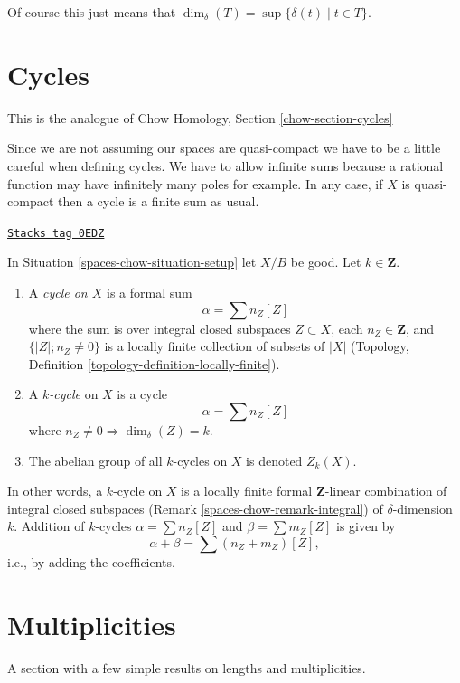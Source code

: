 Of course this just means that
$\dim_\delta(T) = \sup \{\delta(t) \mid t \in T\}$.

\section{Cycles}
\label{spaces-chow-section-cycles}
This is the analogue of Chow Homology, Section \ref{chow-section-cycles}

\medskip\noindent
Since we are not assuming our spaces are quasi-compact we have
to be a little careful when defining cycles. We have to allow
infinite sums because a rational function may have infinitely many
poles for example. In any case, if $X$ is quasi-compact then a
cycle is a finite sum as usual.

\begin{definition}[Cycles]
\label{spaces-chow-definition-cycles}
\href{https://stacks.math.columbia.edu/tag/0EDZ}{\texttt{Stacks tag 0EDZ}}

In Situation \ref{spaces-chow-situation-setup} let $X/B$ be good.
Let $k \in \mathbf{Z}$.
\begin{enumerate}
\item A {\it cycle on $X$} is a formal sum
$$
\alpha = \sum n_Z [Z]
$$
where the sum is over integral closed subspaces $Z \subset X$,
each $n_Z \in \mathbf{Z}$, and
$\{|Z|; n_Z \not = 0\}$ is a locally finite
collection of subsets of $|X|$
(Topology, Definition \ref{topology-definition-locally-finite}).
\item A {\it $k$-cycle} on $X$ is
a cycle
$$
\alpha = \sum n_Z [Z]
$$
where $n_Z \not = 0 \Rightarrow \dim_\delta(Z) = k$.
\item The abelian group of all $k$-cycles on $X$ is denoted $Z_k(X)$.
\end{enumerate}
\end{definition}

In other words, a $k$-cycle on $X$ is a locally finite formal
$\mathbf{Z}$-linear combination of integral closed subspaces
(Remark \ref{spaces-chow-remark-integral}) of $\delta$-dimension $k$.
Addition of $k$-cycles $\alpha = \sum n_Z[Z]$ and
$\beta = \sum m_Z[Z]$ is given by
$$
\alpha + \beta = \sum (n_Z + m_Z)[Z],
$$
i.e., by adding the coefficients.

\section{Multiplicities}
\label{spaces-chow-section-multiplicities}
A section with a few simple results on lengths and multiplicities.

